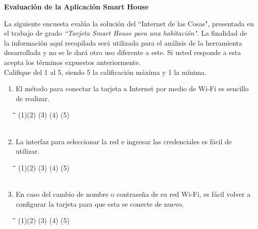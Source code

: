 \documentclass[]{proc}
\begin{document}
	
\textbf{Evaluación de la Aplicación Smart House\\}

La siguiente encuesta evalúa la solución del ``Internet de las Cosas", presentada en el trabajo de grado \textit{``Tarjeta Smart House para una habitación"}. La finalidad de la información aquí recopilada será utilizada para el análisis de la herramienta desarrollada y no se le dará otro uso diferente a este. Si usted responde a esta acepta los términos expuestos anteriormente.\\

Califique del 1 al 5, siendo 5 la calificación máxima y 1 la mínima.\\

\begin{enumerate}
	\item El método para conectar la tarjeta a Internet por medio de Wi-Fi es sencillo de realizar.
	
	\begin{tabbing}
		\hspace{1cm}\=\hspace{1cm}\=\hspace{1cm}\=\hspace{1cm}\=\kill
		(1)\>(2)  \>(3)  \>(4)  \>(5)\\\\
	\end{tabbing}
	
	\item La interfaz para seleccionar la red e ingresar las credenciales es fácil de utilizar. 
	
	\begin{tabbing}
		\hspace{1cm}\=\hspace{1cm}\=\hspace{1cm}\=\hspace{1cm}\=\kill
		(1)\>(2)  \>(3)  \>(4)  \>(5) \\\\
	\end{tabbing} 
	
	\item En caso del cambio de nombre o contraseña de su red Wi-Fi, es fácil volver a configurar la tarjeta para que esta se conecte de nuevo.
	
	\begin{tabbing}
		\hspace{1cm}\=\hspace{1cm}\=\hspace{1cm}\=\hspace{1cm}\=\kill
		(1)\>(2)  \>(3)  \>(4)  \>(5) \\\\
	\end{tabbing} 
	

\end{enumerate}
\end{document}
